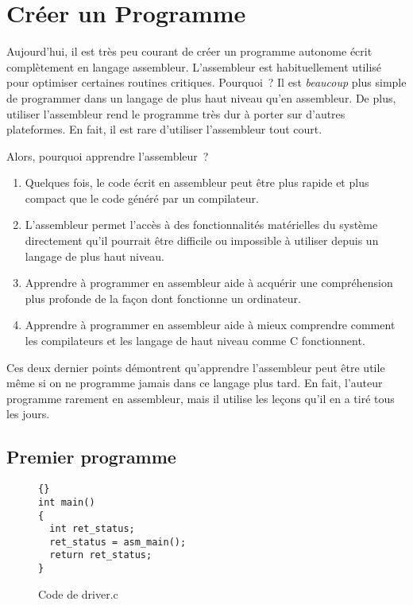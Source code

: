 \section{Créer un Programme}

Aujourd'hui, il est très peu courant de créer un programme autonome écrit complètement
en langage assembleur. L'assembleur est habituellement utilisé pour optimiser
certaines routines critiques. Pourquoi~? Il est \emph{beaucoup} plus simple de
programmer dans un langage de plus haut niveau qu'en assembleur. De plus, utiliser
l'assembleur rend le programme très dur à porter sur d'autres plateformes.
En fait, il est rare d'utiliser l'assembleur tout court.

Alors, pourquoi apprendre l'assembleur~?
\begin{enumerate}
\item Quelques fois, le code écrit en assembleur peut être plus rapide et plus compact
	que le code généré par un compilateur.
\item L'assembleur permet l'accès à des fonctionnalités matérielles du système directement
	qu'il pourrait être difficile ou impossible à utiliser depuis un langage de plus haut
	niveau.
\item Apprendre à programmer en assembleur aide à acquérir une compréhension plus profonde
	de la façon dont fonctionne un ordinateur.
\item Apprendre à programmer en assembleur aide à mieux comprendre comment les compilateurs et
	les langage de haut niveau comme C fonctionnent.
\end{enumerate}
Ces deux dernier points démontrent qu'apprendre l'assembleur peut être utile même si on ne
programme jamais dans ce langage plus tard. En fait, l'auteur programme rarement en assembleur,
mais il utilise les leçons qu'il en a tiré tous les jours.

\subsection{Premier programme}

\begin{figure}[t]
\begin{lstlisting}[frame=tlrb]{}
int main()
{
  int ret_status;
  ret_status = asm_main();
  return ret_status;
}
\end{lstlisting}
\caption{Code de {\code driver.c} \label{fig:driverProg} }
\end{figure}

